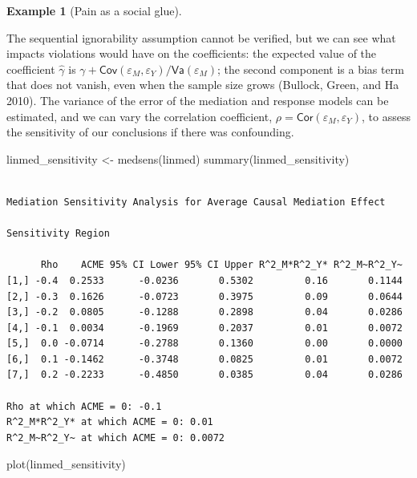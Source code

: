 \documentclass[
  11pt,
  letterpaper,
]{scrbook}
\newenvironment{Shaded}{\begin{snugshade}}{\end{snugshade}}
\newcommand{\FunctionTok}[1]{\textcolor[rgb]{0.28,0.35,0.67}{#1}}
\newcommand{\NormalTok}[1]{\textcolor[rgb]{0.00,0.23,0.31}{#1}}
\newcommand{\OtherTok}[1]{\textcolor[rgb]{0.00,0.23,0.31}{#1}}
\theoremstyle{definition}
\newtheorem{example}{Example}[chapter]
\theoremstyle{definition}
\theoremstyle{remark}
\begin{document}
\begin{example}[Pain as a social
glue]
\begin{figure}[ht!]
\end{figure}%

The sequential ignorability assumption cannot be verified, but we can
see what impacts violations would have on the coefficients: the expected
value of the coefficient \(\widehat{\gamma}\) is
\(\gamma + \mathsf{Cov}(\varepsilon_M, \varepsilon_Y)/\mathsf{Va}(\varepsilon_M)\);
the second component is a bias term that does not vanish, even when the
sample size grows (Bullock, Green, and Ha 2010). The variance of the
error of the mediation and response models can be estimated, and we can
vary the correlation coefficient,
\(\rho=\mathsf{Cor}(\varepsilon_M, \varepsilon_Y)\), to assess the
sensitivity of our conclusions if there was confounding.

\begin{Shaded}
\begin{Highlighting}[]
\NormalTok{linmed\_sensitivity }\OtherTok{\textless{}{-}} \FunctionTok{medsens}\NormalTok{(linmed)}
\FunctionTok{summary}\NormalTok{(linmed\_sensitivity)}
\end{Highlighting}
\end{Shaded}

\begin{verbatim}

Mediation Sensitivity Analysis for Average Causal Mediation Effect

Sensitivity Region

      Rho    ACME 95% CI Lower 95% CI Upper R^2_M*R^2_Y* R^2_M~R^2_Y~
[1,] -0.4  0.2533      -0.0236       0.5302         0.16       0.1144
[2,] -0.3  0.1626      -0.0723       0.3975         0.09       0.0644
[3,] -0.2  0.0805      -0.1288       0.2898         0.04       0.0286
[4,] -0.1  0.0034      -0.1969       0.2037         0.01       0.0072
[5,]  0.0 -0.0714      -0.2788       0.1360         0.00       0.0000
[6,]  0.1 -0.1462      -0.3748       0.0825         0.01       0.0072
[7,]  0.2 -0.2233      -0.4850       0.0385         0.04       0.0286

Rho at which ACME = 0: -0.1
R^2_M*R^2_Y* at which ACME = 0: 0.01
R^2_M~R^2_Y~ at which ACME = 0: 0.0072 
\end{verbatim}

\begin{Shaded}
\begin{Highlighting}[]
\FunctionTok{plot}\NormalTok{(linmed\_sensitivity)}
\end{Highlighting}
\end{Shaded}


\end{example}
\end{document}
